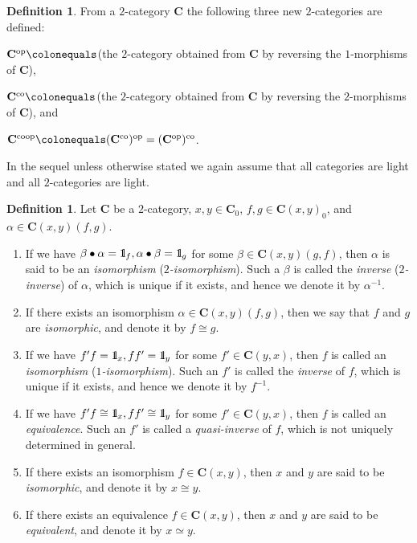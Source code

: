 \documentclass{surv-l}
\numberwithin{equation}{chapter}
\numberwithin{figure}{chapter}
\theoremstyle{plain}
\theoremstyle{definition}
\newtheorem{dfn}[thm]{Definition}
\theoremstyle{remark}
\newcommand{\id}{1\kern-.25em{\text{{\rm l}}}}
\begin{document}
\begin{dfn}\label{dfn:coop}
From a $2$-category $\mathbf{C}$ the following three new $2$-categories
are defined:

$\mathbf{C}^{\text{op}}\colonequals $(the $2$-category obtained from $\mathbf{C}$ by reversing the $1$-morphisms of $\mathbf{C}$),

$\mathbf{C}^{\text{co}}\colonequals $(the $2$-category obtained from $\mathbf{C}$ by reversing the $2$-morphisms of $\mathbf{C}$), and

$\mathbf{C}^{\text{coop}}\colonequals (\mathbf{C}^{\text{co}})^{\text{op}}=(\mathbf{C}^{\text{op}})^{\text{co}}$.
\end{dfn}

In the sequel unless otherwise stated
we again assume that all categories are light and all $2$-categories are light.

\begin{dfn}
Let $\mathbf{C}$ be a $2$-category,  $x, y \in \mathbf{C}_0$, $f, g \in \mathbf{C}(x, y)_0$,
and $\alpha \in \mathbf{C}(x, y)(f, g)$.
\begin{enumerate}
\item
If we have $\beta\bullet\alpha = \id_f, \alpha\bullet\beta = \id_g$
for some $\beta \in \mathbf{C}(x,y)(g,f)$, then
$\alpha$ is said to be an \emph{isomorphism} (\emph{$2$-isomorphism}).
Such a $\beta$ is called the \emph{inverse} (\emph{$2$-inverse}) of $\alpha$,
which is unique if it exists, and hence we denote it by $\alpha^{-1}$.
\item
If there exists an isomorphism $\alpha \in \mathbf{C}(x,y)(f,g)$, then
we say that $f$ and $g$ are \emph{isomorphic}, and denote it by
$f \cong g$.
\item
If we have $f'f = \id_x, ff' = \id_y$ for some
$f' \in \mathbf{C}(y,x)$, then $f$ is called an \emph{isomorphism}
(\emph{$1$-isomorphism}).
Such an $f'$ is called the \emph{inverse} of $f$, which is unique if it exists,
and hence we denote it by $f^{-1}$.
\item
If we have $f'f \cong \id_x, ff' \cong \id_y$ for some
$f' \in \mathbf{C}(y,x)$, then $f$ is called an \emph{equivalence}.
Such an $f'$ is called a \emph{quasi-inverse} of $f$, which
is not uniquely determined in general.
\item
If there exists an isomorphism
$f \in \mathbf{C}(x,y)$, then $x$ and $y$ are said to be \emph{isomorphic},
and denote it by $x \cong y$.
\item
If there exists an equivalence $f \in \mathbf{C}(x,y)$, then
$x$ and $y$ are said to be \emph{equivalent}, and denote it by
$x \simeq y$.
\end{enumerate}
\end{dfn}
\end{document}
